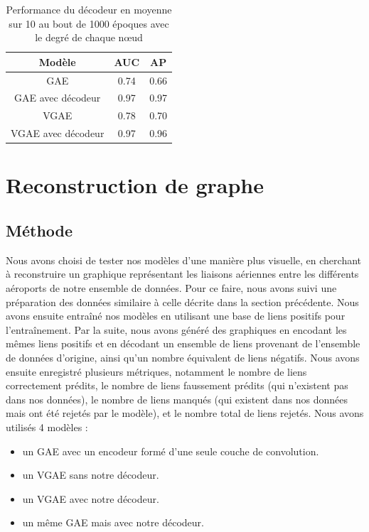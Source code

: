 \documentclass{article}
\begin{document}
\begin{table}[H]
    \centering
    \begin{tabular}{|c|c|c|}
        \hline
        Modèle & AUC & AP\\
        \hline
        GAE & 0.74 & 0.66\\
        \hline
        GAE avec décodeur & 0.97 & 0.97\\
        \hline
        VGAE & 0.78 & 0.70\\
        \hline
        VGAE avec décodeur & 0.97 & 0.96\\
        \hline
    \end{tabular}
    \caption{Performance du décodeur en moyenne sur 10 au bout de 1000 époques avec le degré de chaque nœud}
    \label{tab:performance_decodeur_avec_degre}
\end{table}

\section{Reconstruction de graphe}
\subsection{Méthode}
Nous avons choisi de tester nos modèles d'une manière plus visuelle, en cherchant à reconstruire un graphique représentant les liaisons aériennes entre les différents aéroports de notre ensemble de données. Pour ce faire, nous avons suivi une préparation des données similaire à celle décrite dans la section précédente. Nous avons ensuite entraîné nos modèles en utilisant une base de liens positifs pour l'entraînement. Par la suite, nous avons généré des graphiques en encodant les mêmes liens positifs et en décodant un ensemble de liens provenant de l'ensemble de données d'origine, ainsi qu'un nombre équivalent de liens négatifs. Nous avons ensuite enregistré plusieurs métriques, notamment le nombre de liens correctement prédits, le nombre de liens faussement prédits (qui n'existent pas dans nos données), le nombre de liens manqués (qui existent dans nos données mais ont été rejetés par le modèle), et le nombre total de liens rejetés.
Nous avons utilisés 4 modèles :
\begin{itemize}
    \item un GAE avec un encodeur formé d’une seule couche de convolution.
    \item un VGAE sans notre décodeur.
    \item un VGAE avec notre décodeur.
    \item un même GAE mais avec notre décodeur.
\end{itemize}
\end{document}
